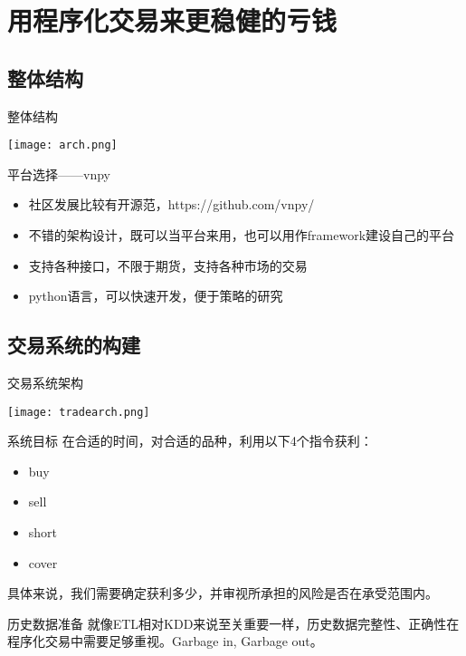 \documentclass{beamer}
\begin{document}
\section{用程序化交易来更稳健的亏钱}
\subsection{整体结构}
\begin{frame}{整体结构}
  \begin{center}
    \texttt{[image: arch.png]}
  \end{center}
\end{frame}
\begin{frame}{平台选择——vnpy}
  \begin{itemize}
    \item 社区发展比较有开源范，https://github.com/vnpy/
    \item 不错的架构设计，既可以当平台来用，也可以用作framework建设自己的平台
    \item 支持各种接口，不限于期货，支持各种市场的交易
    \item python语言，可以快速开发，便于策略的研究
  \end{itemize}
\end{frame}
\subsection{交易系统的构建}
\begin{frame}{交易系统架构}
  \begin{center}
    \texttt{[image: tradearch.png]}
  \end{center}
\end{frame}
\begin{frame}{系统目标}
  在合适的时间，对合适的品种，利用以下4个指令获利：
  \begin{itemize}
    \item buy
    \item sell
    \item short
    \item cover
  \end{itemize}
  具体来说，我们需要确定获利多少，并审视所承担的风险是否在承受范围内。
\end{frame}

\begin{frame}{历史数据准备}
  就像ETL相对KDD来说至关重要一样，历史数据完整性、正确性在程序化交易中需要足够重视。Garbage in, Garbage out。
\end{frame}
\end{document}
